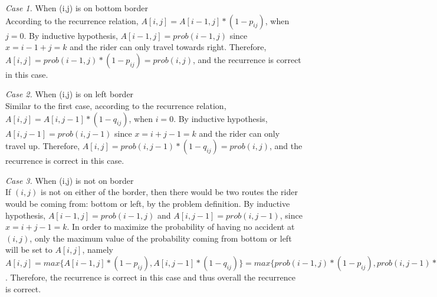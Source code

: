 \documentclass[11pt]{article}
\begin{document}
\begin{enumerate}
\begin{enumerate}
            \textit{Case 1.} When (i,j) is on bottom border \\
            According to the recurrence relation, $A[i,j]=A[i-1,j]*(1-p_{ij})$, when $j=0$. By inductive hypothesis, $A[i-1,j] = prob(i-1,j)$ since $x=i-1+j=k$ and the rider can only travel towards right. Therefore, $A[i,j]=prob(i-1,j)*(1-p_{ij})=prob(i,j)$, and the recurrence is correct in this case.
            
            \textit{Case 2.} When (i,j) is on left border \\
            Similar to the first case, according to the recurrence relation, $A[i,j]=A[i,j-1]*(1-q_{ij})$, when $i=0$. By inductive hypothesis, $A[i,j-1]=prob(i,j-1)$ since $x=i+j-1=k$ and the rider can only travel up. Therefore, $A[i,j]=prob(i,j-1)*(1-q_{ij})=prob(i,j)$, and the recurrence is correct in this case.
            
            \textit{Case 3.} When (i,j) is not on border \\
            If $(i,j)$ is not on either of the border, then there would be two routes the rider would be coming from: bottom or left, by the problem definition. By inductive hypothesis, $A[i-1,j]=prob(i-1,j)$ and $A[i,j-1]=prob(i,j-1)$, since $x=i+j-1=k$. In order to maximize the probability of having no accident at $(i,j)$, only the maximum value of the probability coming from bottom or left will be set to $A[i,j]$, namely $A[i,j]=max\{ A[i-1, j] * (1- p_{ij}), A[i, j-1] * (1 - q_{ij})\}=max\{ prob(i-1,j) * (1-p_{ij}), prob(i,j-1) * (1-q_{ij})\}=prob(i,j)$. Therefore, the recurrence is correct in this case and thus overall the recurrence is correct.
            

\end{enumerate}
\end{enumerate}
\end{document}
